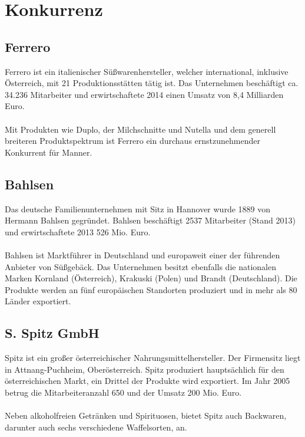 \section{Konkurrenz}
\subsection{Ferrero}
Ferrero ist ein italienischer Süßwarenhersteller, welcher international, inklusive Österreich, mit 21 Produktionsstätten tätig ist. Das Unternehmen beschäftigt ca. 34.236 Mitarbeiter und erwirtschaftete 2014 einen Umsatz von 8,4 Milliarden Euro. \cite{wiki_ferrero} \\\\
Mit Produkten wie Duplo, der Milchschnitte und Nutella und dem generell breiteren Produktspektrum ist Ferrero ein durchaus ernstzunehmender Konkurrent für Manner.
\subsection{Bahlsen}
Das deutsche Familienunternehmen mit Sitz in Hannover wurde 1889 von Hermann Bahlsen gegründet. Bahlsen beschäftigt 2537 Mitarbeiter (Stand 2013) und erwirtschaftete 2013 526 Mio. Euro. \cite{wiki_bahlsen}\\\\
Bahlsen ist Marktführer in Deutschland und europaweit einer der führenden Anbieter von Süßgebäck. Das Unternehmen besitzt ebenfalls die nationalen Marken Kornland (Österreich), Krakuski (Polen) und Brandt (Deutschland). Die Produkte werden an fünf europäischen Standorten produziert und in mehr als 80 Länder exportiert. \cite{bahlsen}
\subsection{S. Spitz GmbH}
Spitz ist ein großer österreichischer Nahrungsmittelhersteller. Der Firmensitz liegt in Attnang-Puchheim, Oberösterreich. Spitz produziert hauptsächlich für den österreichischen Markt, ein Drittel der Produkte wird exportiert. Im Jahr 2005 betrug die Mitarbeiteranzahl 650 und der Umsatz 200 Mio. Euro. \cite{wiki_spitz} \\\\
Neben alkoholfreien Getränken und Spirituosen, bietet Spitz auch Backwaren, darunter auch sechs verschiedene Waffelsorten, an. \cite{spitz_produkte}